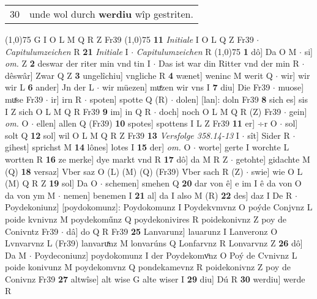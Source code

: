 \documentclass[8pt,a4paper,notitlepage]{article}
\begin{document}
\begin{table}[ht]
\begin{minipage}[t]{0.5\linewidth}
\begin{tabular}{rl}
30 & unde wol durch \textbf{werdiu} wîp gestriten.\\ 
\end{tabular}
\scriptsize
\line(1,0){75} \newline
G I O L M Q R Z Fr39 \newline
\line(1,0){75} \newline
\textbf{11} \textit{Initiale} I O L Q Z Fr39   $\cdot$ \textit{Capitulumzeichen} R  \textbf{21} \textit{Initiale} I   $\cdot$ \textit{Capitulumzeichen} R  \newline
\line(1,0){75} \newline
\textbf{1} dô] Da O M  $\cdot$ si] \textit{om.} Z \textbf{2} deswar der riter min vnd tin I  $\cdot$ Das ist war din Ritter vnd der min R  $\cdot$ dêswâr] Zwar Q Z \textbf{3} ungelîchiu] vngliche R \textbf{4} wænet] weninc M werit Q  $\cdot$ wir] wir wir L \textbf{6} ander] Jn der L  $\cdot$ wir müezen] muͤzen wir vns I \textbf{7} diu] Die Fr39  $\cdot$ muose] muͤse Fr39  $\cdot$ ir] irn R  $\cdot$ spoten] spotte Q (R)  $\cdot$ dolen] [lan]: doln Fr39 \textbf{8} sich es] sis I Z sich O L M Q R Fr39 \textbf{9} im] in Q R  $\cdot$ doch] noch O L M Q R (Z) Fr39  $\cdot$ gein] \textit{om.} O  $\cdot$ ellen] allen Q (Fr39) \textbf{10} spotes] spottens I L Z Fr39 \textbf{11} er] ÷r O  $\cdot$ sol] solt Q \textbf{12} sol] wil O L M Q R Z Fr39 \textbf{13} \textit{Versfolge 358.14-13} I   $\cdot$ sît] Sider R  $\cdot$ gihest] sprichst M \textbf{14} lônes] lotes I \textbf{15} der] \textit{om.} O  $\cdot$ worte] gerte I worchte L wortten R \textbf{16} ze merke] dye markt vnd R \textbf{17} dô] da M R Z  $\cdot$ getohte] gidachte M (Q) \textbf{18} versaz] Vber saz O (L) (M) (Q) (Fr39) V́ber sach R (Z)  $\cdot$ swie] wie O L (M) Q R Z \textbf{19} sol] Da O  $\cdot$ schemen] smehen Q \textbf{20} dar von ê] e im I ê da von O da von ym M  $\cdot$ nemen] benemen I \textbf{21} al] da I also M (R) \textbf{22} des] daz I De R  $\cdot$ Poydekoniunz] [poydokomunz]: Poydokomunz I Poydekvmvnz O poýde Conjvnz L poide kvnivnz M poydekoműnz Q poydekonivires R poidekonivnz Z poy de Conivntz Fr39  $\cdot$ dâ] do Q R Fr39 \textbf{25} Lanvarunz] lauarunz I Lanveronz O Lvnvarvnz L (Fr39) lanvaruͯnz M lonvarúns Q Lonfarvnz R Lonvarvnz Z \textbf{26} dô] Da M  $\cdot$ Poydeconiunz] poydokomunz I der Poydekomvͦnz O Poý de Cvnivnz L poide konivunz M poydekomvnz Q pondekamevnz R poidekonivnz Z poy de Conivnz Fr39 \textbf{27} altwîse] alt wise G alte wiser I \textbf{29} diu] Dú R \textbf{30} werdiu] werde R \newline
\end{minipage}

\end{table}
\end{document}
